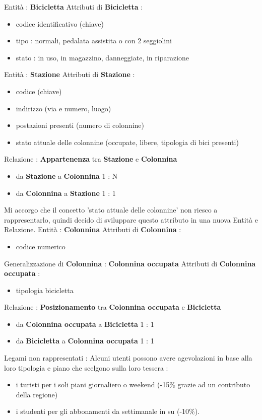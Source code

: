 \documentclass[a4paper,twoside]{article}
\begin{document}
Entità : \textbf{Bicicletta}\newline
Attributi di \textbf{Bicicletta} :
\begin{itemize}
 \item codice identificativo (chiave)
 \item tipo : normali, pedalata assistita o con 2 seggiolini
 \item stato : in uso, in magazzino, danneggiate, in riparazione
\end{itemize}
Entità : \textbf{Stazione}\newline
Attributi di \textbf{Stazione} :
\begin{itemize}
 \item codice (chiave)
 \item indirizzo (via e numero, luogo)
 \item postazioni presenti (numero di colonnine)
 \item stato attuale delle colonnine (occupate, libere, tipologia di bici presenti)
 \end{itemize}
Relazione : \textbf{Appartenenza} tra \textbf{Stazione} e \textbf{Colonnina}
\begin{itemize}
 \item da \textbf{Stazione} a \textbf{Colonnina} 1 : N
 \item da \textbf{Colonnina} a \textbf{Stazione} 1 : 1
\end{itemize}
Mi accorgo che il concetto 'stato attuale delle colonnine' non riesco a rappresentarlo, quindi decido di sviluppare questo attributo in una nuova Entità e Relazione.\newline
Entità : \textbf{Colonnina}\newline
Attributi di \textbf{Colonnina} :
\begin{itemize}
 \item codice numerico
\end{itemize}
Generalizzazione di \textbf{Colonnina} : \textbf{Colonnina occupata}\newline
Attributi di \textbf{Colonnina occupata} :
\begin{itemize}
 \item tipologia bicicletta
\end{itemize}
Relazione : \textbf{Posizionamento} tra \textbf{Colonnina occupata} e \textbf{Bicicletta}
\begin{itemize}
 \item da \textbf{Colonnina occupata} a \textbf{Bicicletta} 1 : 1
 \item da \textbf{Bicicletta} a \textbf{Colonnina occupata} 1 : 1
\end{itemize}
%
%
Legami non rappresentati :\newline
Alcuni utenti possono avere agevolazioni in base alla loro tipologia e piano che scelgono sulla loro tessera :
\begin{itemize}
 \item  i turisti per i soli piani giornaliero o weekend (-15\% grazie ad un contributo della regione)
 \item i studenti per gli abbonamenti da settimanale in su (-10\%).
\end{itemize}
\end{document}

